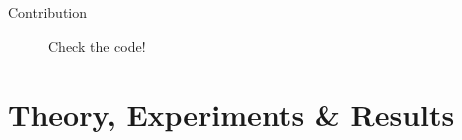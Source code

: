 \documentclass[handout]{beamer}\mode<handout>{\usetheme{AMSBolognaFC}}
\begin{document}
\begin{frame}{Contribution}
\begin{figure}
\begin{minipage}{0.3\textwidth}
            \caption{Check the code!}
        \end{minipage}
        \hfill
        \label{fig:telegram-bot}
    \end{figure}


\end{frame}

\section{Theory, Experiments \& Results}
\end{document}
